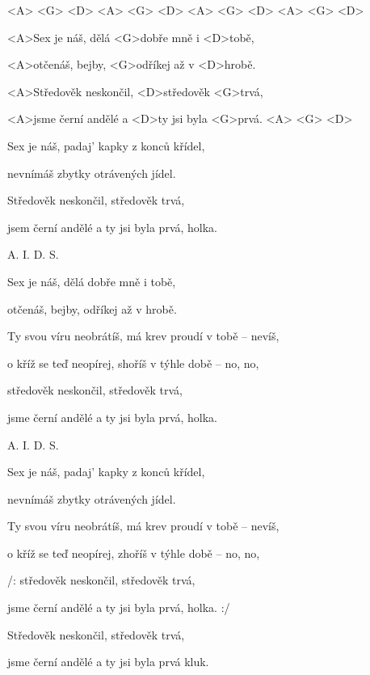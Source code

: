 

<A> <G> <D> <A> <G> <D> <A> <G> <D> <A> <G> <D>

\zs
<A>Sex je náš, dělá <G>dobře mně i <D>tobě,

<A>otčenáš, bejby, <G>odříkej až v <D>hrobě.

<A>Středověk neskončil, <D>středověk <G>trvá,

<A>jsme černí andělé a <D>ty jsi byla <G>prvá. <A> 
<G> <D>
\ks

\zs
Sex je náš, padaj' kapky z konců křídel,

nevnímáš zbytky otrávených jídel.

Středověk neskončil, středověk trvá,

jsem černí andělé a ty jsi byla prvá, holka.
\ks

A. I. D. S.

\zs
Sex je náš, dělá dobře mně i tobě,

otčenáš, bejby, odříkej až v hrobě.

Ty svou víru neobrátíš, má krev proudí v tobě -- nevíš,

o kříž se teď neopírej, shoříš v týhle době -- no, no,

středověk neskončil, středověk trvá,

jsme černí andělé a ty jsi byla prvá, holka.
\ks

A. I. D. S.

\zs
Sex je náš, padaj' kapky z konců křídel,

nevnímáš zbytky otrávených jídel.

Ty svou víru neobrátíš, má krev proudí v tobě -- nevíš,

o kříž se teď neopírej, zhoříš v týhle době -- no, no,

/: středověk neskončil, středověk trvá,

jsme černí andělé a ty jsi byla prvá, holka. :/

Středověk neskončil, středověk trvá,

jsme černí andělé a ty jsi byla prvá kluk.
\ks

\kp
